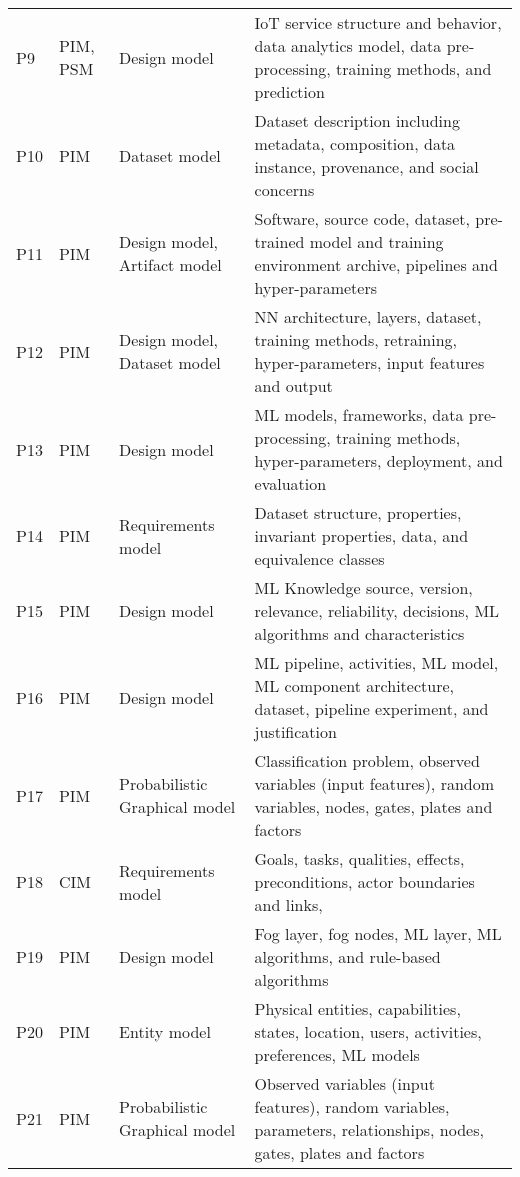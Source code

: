 \begin{table}[htbp]
{\begin{tabular}{l l l l }
            \TBstrut P9 \TBstrut	& PIM, PSM    &  Design model &  IoT service structure and behavior, data analytics model, data pre-processing, training methods, and prediction  \TBstrut \\
            \TBstrut P10 \TBstrut	& PIM    & Dataset model & Dataset description including metadata, composition, data instance, provenance, and social concerns \TBstrut \\
            \TBstrut P11 \TBstrut	& PIM    & Design model, Artifact model & Software, source code, dataset, pre-trained model and training environment archive, pipelines and hyper-parameters\TBstrut \\
            \TBstrut P12 \TBstrut	& PIM    & Design model, Dataset model  & NN architecture, layers, dataset, training methods, retraining, hyper-parameters, input features and output\TBstrut \\
            \TBstrut P13 \TBstrut	& PIM   & Design model  & ML models, frameworks, data pre-processing, training methods, hyper-parameters, deployment, and evaluation\TBstrut \\
            \TBstrut P14 \TBstrut	& PIM   & Requirements model & Dataset structure, properties, invariant properties, data, and equivalence classes\TBstrut \\
            \TBstrut P15 \TBstrut	& PIM    & Design model  & ML Knowledge source, version, relevance, reliability, decisions, ML algorithms and characteristics\TBstrut \\
            \TBstrut P16 \TBstrut	& PIM    & Design model  & ML pipeline, activities, ML model, ML component architecture, dataset, pipeline experiment, and justification \TBstrut \\
            \TBstrut P17 \TBstrut	& PIM    & Probabilistic Graphical model  & Classification problem, observed variables (input features), random variables, nodes, gates, plates and factors \TBstrut \\
            \TBstrut P18 \TBstrut	& CIM    & Requirements model & Goals, tasks, qualities, effects, preconditions, actor boundaries and links, \TBstrut \\
            \TBstrut P19 \TBstrut	& PIM    & Design model  & Fog layer, fog nodes, ML layer, ML algorithms, and rule-based algorithms \TBstrut\\
            \TBstrut P20 \TBstrut	& PIM    & Entity model & Physical entities, capabilities, states, location, users, activities, preferences, ML models\TBstrut \\
            \TBstrut P21 \TBstrut	& PIM    & Probabilistic Graphical model & Observed variables (input features), random variables, parameters, relationships, nodes, gates, plates and factors\TBstrut\\

\end{tabular}}
\end{table}
